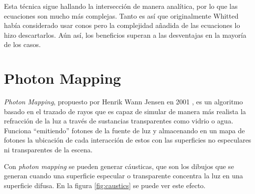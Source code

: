 Esta técnica sigue hallando la intersección de manera analítica, por lo que las ecuaciones son mucho más complejas.
Tanto es así que originalmente Whitted había considerado usar conos pero la complejidad añadida de las ecuaciones lo hizo descartarlos.
Aún así, los beneficios superan a las desventajas en la mayoría de los casos.

\section{Photon Mapping}\label{sec:photon-mapping}

\textit{Photon Mapping}, propuesto por Henrik Wann Jensen en 2001 \cite{photon-mapping}, es un algoritmo basado en el trazado de rayos que es capaz de simular de manera más realista la refracción de la luz a través de sustancias transparentes como vidrio o agua. 
Funciona ``emitiendo'' fotones de la fuente de luz y almacenando en un mapa de fotones la ubicación de cada interacción de estos con las superficies no especulares ni transparentes de la escena.

Con \textit{photon mapping} se pueden generar cáusticas, que son los dibujos que se generan cuando una superficie especular o transparente concentra la luz en una superficie difusa.
En la figura \ref{fig:caustics} se puede ver este efecto.

